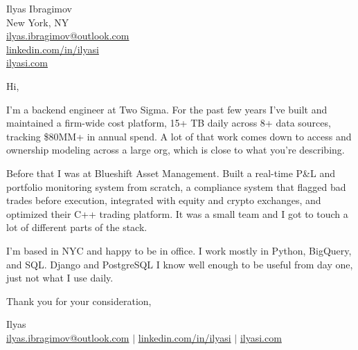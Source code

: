 \documentclass[letterpaper,11pt]{article}
\begin{document}
\noindent Ilyas Ibragimov \\
New York, NY \\
\href{mailto:ilyas.ibragimov@outlook.com}{ilyas.ibragimov@outlook.com} \\
\href{https://www.linkedin.com/in/ilyasi/}{linkedin.com/in/ilyasi} \\
\href{https://ilyasi.com}{ilyasi.com}

\vspace{1em}

\noindent Hi,

\vspace{1em}

\noindent I'm a backend engineer at Two Sigma. For the past few years I've built and maintained a firm-wide cost platform, 15+ TB daily across 8+ data sources, tracking \$80MM+ in annual spend. A lot of that work comes down to access and ownership modeling across a large org, which is close to what you're describing.

\vspace{1em}

\noindent Before that I was at Blueshift Asset Management. Built a real-time P\&L and portfolio monitoring system from scratch, a compliance system that flagged bad trades before execution, integrated with equity and crypto exchanges, and optimized their C++ trading platform. It was a small team and I got to touch a lot of different parts of the stack.

\vspace{1em}

\noindent I'm based in NYC and happy to be in office. I work mostly in Python, BigQuery, and SQL. Django and PostgreSQL I know well enough to be useful from day one, just not what I use daily.

\vspace{1em}

\noindent Thank you for your consideration,

\vspace{1em}

\noindent Ilyas \\
\href{mailto:ilyas.ibragimov@outlook.com}{ilyas.ibragimov@outlook.com} $|$ \href{https://www.linkedin.com/in/ilyasi/}{linkedin.com/in/ilyasi} $|$ \href{https://ilyasi.com}{ilyasi.com}
\end{document}
